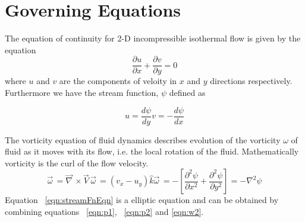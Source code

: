 \documentclass{article}
\begin{document}
\section{Governing Equations}
\label{govEqn}
The equation of continuity for 2-D incompressible isothermal flow  \citep{Pedlosky, anderson1995computational} is given by the equation
\begin{equation}
\label{eqn:continuityEqn}
\frac{\partial u}{\partial x} + \frac{\partial v}{\partial y} = 0  
\end{equation}
where $u$ and $v$ are the components of veloity in $x$ and $y$ directions respectively. Furthermore we have the stream function, $\psi$ defined as

\begin{subequations}
\begin{equation}
\label{eqn:p1}
u = \frac{d\psi}{dy} 
\end{equation}
\begin{equation}
\label{eqn:p2}
v = -\frac{d\psi}{dx}
\end{equation}
\end{subequations}

The vorticity equation of fluid dynamics describes evolution of the vorticity $\omega$ of fluid as it moves with its flow, i.e. the local rotation of the fluid. Mathematically vorticity is the curl of the flow velocity.
\begin{subequations}
\begin{equation}
\label{eqn:w1}
\vec{\omega}^{\,} = \vec{\nabla}^{\,} \times \vec{V}^{\,}
\end{equation}
\begin{equation}
\label{eqn:w2}
\vec{\omega}^{\,} = (v_x - u_y)\hat{k}
\end{equation}
\begin{equation}
\label{eqn:streamFnEqn}
\vec{\omega}^{\,} = -\left[\frac{\partial^2 \psi}{\partial x^2} +  \frac{\partial^2 \psi}{\partial y^2}\right]=-\nabla^2 \psi
\end{equation}
\end{subequations}
Equation  ~\ref{eqn:streamFnEqn} is a elliptic equation and can be obtained by combining equations ~\ref{eqn:p1}, ~\ref{eqn:p2} and \ref{eqn:w2}.
\end{document}
